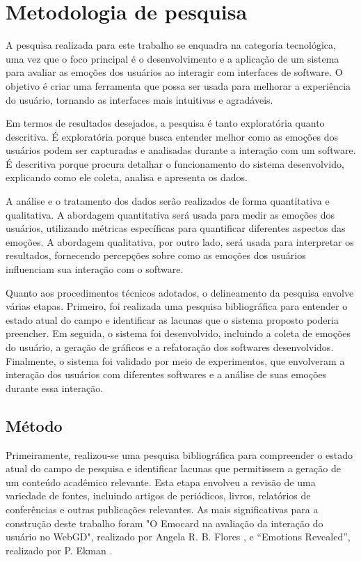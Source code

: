 \chapter{Metodologia de pesquisa}

A pesquisa realizada para este trabalho se enquadra na categoria tecnológica, uma vez que o foco principal é o desenvolvimento e a aplicação de um sistema para avaliar as emoções dos usuários ao interagir com interfaces de software. O objetivo é criar uma ferramenta que possa ser usada para melhorar a experiência do usuário, tornando as interfaces mais intuitivas e agradáveis.

Em termos de resultados desejados, a pesquisa é tanto exploratória quanto descritiva. É exploratória porque busca entender melhor como as emoções dos usuários podem ser capturadas e analisadas durante a interação com um software. É descritiva porque procura detalhar o funcionamento do sistema desenvolvido, explicando como ele coleta, analisa e apresenta os dados.

A análise e o tratamento dos dados serão realizados de forma quantitativa e qualitativa. A abordagem quantitativa será usada para medir as emoções dos usuários, utilizando métricas específicas para quantificar diferentes aspectos das emoções. A abordagem qualitativa, por outro lado, será usada para interpretar os resultados, fornecendo percepções sobre como as emoções dos usuários influenciam sua interação com o software.

Quanto aos procedimentos técnicos adotados, o delineamento da pesquisa envolve várias etapas. Primeiro, foi realizada uma pesquisa bibliográfica para entender o estado atual do campo e identificar as lacunas que o sistema proposto poderia preencher. Em seguida, o sistema foi desenvolvido, incluindo a coleta de emoções do usuário, a geração de gráficos e a refatoração dos softwares desenvolvidos. Finalmente, o sistema foi validado por meio de experimentos, que envolveram a interação dos usuários com diferentes softwares e a análise de suas emoções durante essa interação.

\section{Método}

Primeiramente, realizou-se uma pesquisa bibliográfica para compreender o estado atual do campo de pesquisa e identificar lacunas que permitissem a geração de um conteúdo acadêmico relevante. Esta etapa envolveu a revisão de uma variedade de fontes, incluindo artigos de periódicos, livros, relatórios de conferências e outras publicações relevantes. As mais significativas para a construção deste trabalho foram "O Emocard na avaliação da interação do usuário no WebGD", realizado por Angela R. B. Flores \cite{3}, e “Emotions Revealed”, realizado por P. Ekman \cite{5}.

